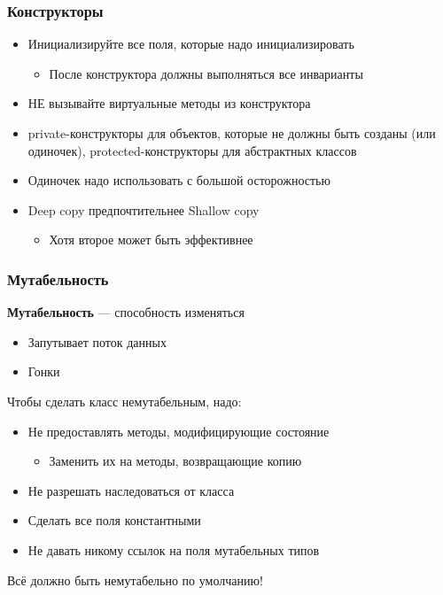 \documentclass[xetex,mathserif,serif]{beamer}
\begin{document}
	\begin{frame}
		\frametitle{Конструкторы}
		\begin{itemize}
			\item Инициализируйте все поля, которые надо инициализировать
			\begin{itemize}
				\item После конструктора должны выполняться все инварианты
			\end{itemize}
			\item НЕ вызывайте виртуальные методы из конструктора
			\item private-конструкторы для объектов, которые не должны быть созданы (или одиночек), protected-конструкторы для абстрактных классов
			\item Одиночек надо использовать с большой осторожностью
			\item Deep copy предпочтительнее Shallow copy
			\begin{itemize}
				\item Хотя второе может быть эффективнее
			\end{itemize}
		\end{itemize}
	\end{frame}

	\begin{frame}
		\frametitle{Мутабельность}
		\textbf{Мутабельность} --- способность изменяться
		\begin{itemize}
			\item Запутывает поток данных
			\item Гонки
		\end{itemize}
		\vspace{3mm}
		Чтобы сделать класс немутабельным, надо:
		\begin{itemize}
			\item Не предоставлять методы, модифицирующие состояние
			\begin{itemize}
				\item Заменить их на методы, возвращающие копию
			\end{itemize}
			\item Не разрешать наследоваться от класса
			\item Сделать все поля константными
			\item Не давать никому ссылок на поля мутабельных типов
		\end{itemize}
		Всё должно быть немутабельно по умолчанию!
	\end{frame}
\end{document}

